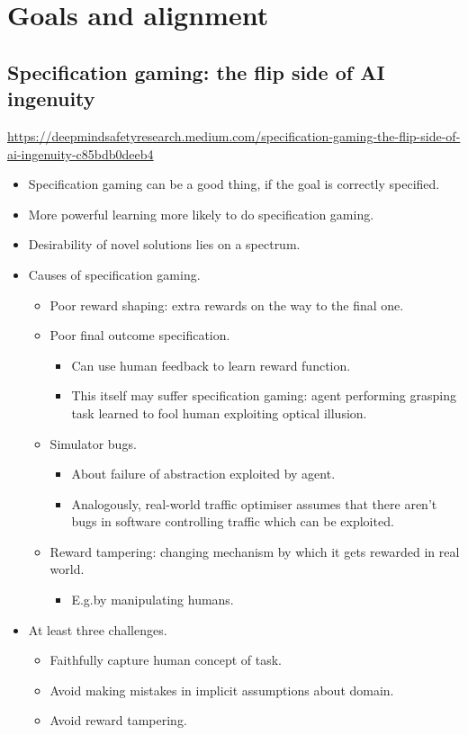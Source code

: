 
\chapter{Goals and alignment}

\section{Specification gaming: the flip side of AI ingenuity}

\url{https://deepmindsafetyresearch.medium.com/specification-gaming-the-flip-side-of-ai-ingenuity-c85bdb0deeb4}

\begin{itemize}
    \item Specification gaming can be a good thing, if the goal is correctly specified.
    \item More powerful learning more likely to do specification gaming.
    \item Desirability of novel solutions lies on a spectrum.
    \item Causes of specification gaming.
    \begin{itemize}
        \item Poor reward shaping: extra rewards on the way to the final one.
        \item Poor final outcome specification.
        \begin{itemize}
            \item Can use human feedback to learn reward function.
            \item This itself may suffer specification gaming: agent performing grasping task learned to fool human exploiting optical illusion.
        \end{itemize}
        \item Simulator bugs.
        \begin{itemize}
            \item About failure of abstraction exploited by agent.
            \item Analogously, real-world traffic optimiser assumes that there aren't bugs in software controlling traffic which can be exploited.
        \end{itemize}
        \item Reward tampering: changing mechanism by which it gets rewarded in real world.
        \begin{itemize}
            \item E.g.\@ by manipulating humans.
        \end{itemize}
    \end{itemize}
    \item At least three challenges.
    \begin{itemize}
        \item Faithfully capture human concept of task.
        \item Avoid making mistakes in implicit assumptions about domain.
        \item Avoid reward tampering.
    \end{itemize}
\end{itemize}


